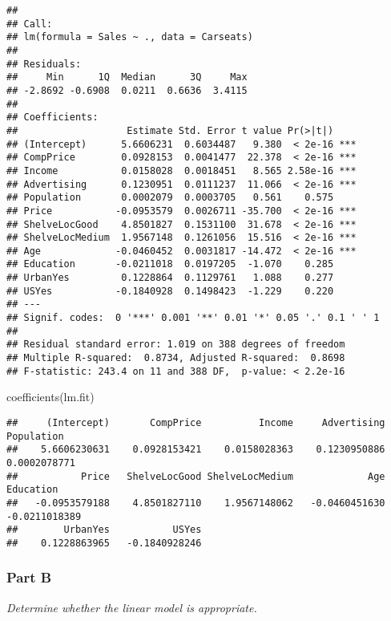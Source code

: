 \documentclass[
]{article}
\newenvironment{Shaded}{\begin{snugshade}}{\end{snugshade}}
\newcommand{\FunctionTok}[1]{\textcolor[rgb]{0.00,0.00,0.00}{#1}}
\newcommand{\NormalTok}[1]{#1}
\begin{document}
\begin{verbatim}
## 
## Call:
## lm(formula = Sales ~ ., data = Carseats)
## 
## Residuals:
##     Min      1Q  Median      3Q     Max 
## -2.8692 -0.6908  0.0211  0.6636  3.4115 
## 
## Coefficients:
##                   Estimate Std. Error t value Pr(>|t|)    
## (Intercept)      5.6606231  0.6034487   9.380  < 2e-16 ***
## CompPrice        0.0928153  0.0041477  22.378  < 2e-16 ***
## Income           0.0158028  0.0018451   8.565 2.58e-16 ***
## Advertising      0.1230951  0.0111237  11.066  < 2e-16 ***
## Population       0.0002079  0.0003705   0.561    0.575    
## Price           -0.0953579  0.0026711 -35.700  < 2e-16 ***
## ShelveLocGood    4.8501827  0.1531100  31.678  < 2e-16 ***
## ShelveLocMedium  1.9567148  0.1261056  15.516  < 2e-16 ***
## Age             -0.0460452  0.0031817 -14.472  < 2e-16 ***
## Education       -0.0211018  0.0197205  -1.070    0.285    
## UrbanYes         0.1228864  0.1129761   1.088    0.277    
## USYes           -0.1840928  0.1498423  -1.229    0.220    
## ---
## Signif. codes:  0 '***' 0.001 '**' 0.01 '*' 0.05 '.' 0.1 ' ' 1
## 
## Residual standard error: 1.019 on 388 degrees of freedom
## Multiple R-squared:  0.8734, Adjusted R-squared:  0.8698 
## F-statistic: 243.4 on 11 and 388 DF,  p-value: < 2.2e-16
\end{verbatim}

\begin{Shaded}
\begin{Highlighting}[]
\FunctionTok{coefficients}\NormalTok{(lm.fit)}
\end{Highlighting}
\end{Shaded}

\begin{verbatim}
##     (Intercept)       CompPrice          Income     Advertising      Population 
##    5.6606230631    0.0928153421    0.0158028363    0.1230950886    0.0002078771 
##           Price   ShelveLocGood ShelveLocMedium             Age       Education 
##   -0.0953579188    4.8501827110    1.9567148062   -0.0460451630   -0.0211018389 
##        UrbanYes           USYes 
##    0.1228863965   -0.1840928246
\end{verbatim}

\hypertarget{part-b}{%
\subsubsection{Part B}\label{part-b}}

\emph{Determine whether the linear model is appropriate.}
\end{document}

